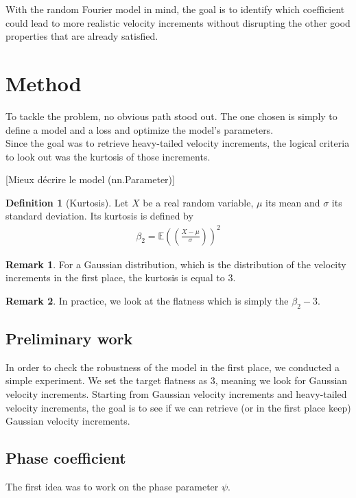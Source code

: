 \documentclass[a4paper,12pt]{article}
\theoremstyle{definition}
\newtheorem{definition}{Definition}
\newtheorem{remark}{Remark}
\begin{document}
\bigskip
With the random Fourier model in mind, the goal is to identify which coefficient could lead to more realistic velocity increments without disrupting the other good properties that are already satisfied. 


\section{Method}
To tackle the problem, no obvious path stood out. 
The one chosen is simply to define a model and a loss and optimize the model's parameters. \\
Since the goal was to retrieve heavy-tailed velocity increments, the logical criteria to look out was the kurtosis of those increments. 

[Mieux décrire le model (nn.Parameter)]

\begin{definition}[Kurtosis]
    Let $X$ be a real random variable, $\mu$ its mean and $\sigma$ its standard deviation. Its kurtosis is defined by 
    \begin{align}
    \beta_2=\mathbb{E}\left((\frac{X-\mu}{\sigma}) \right)^2    
    \end{align}
     
\end{definition}

\begin{remark}
    For a Gaussian distribution, which is the distribution of the velocity increments in the first place, the kurtosis is equal to 3.
\end{remark}

\begin{remark}
    In practice, we look at the flatness which is simply the $\beta_2-3$.
\end{remark}

\subsection{Preliminary work}
In order to check the robustness of the model in the first place, we conducted a simple experiment. We set the target flatness as 3, meaning we look for Gaussian velocity increments. Starting from Gaussian velocity increments and heavy-tailed velocity increments, the goal is to see if we can retrieve (or in the first place keep) Gaussian velocity increments.  


\subsection{Phase coefficient}
The first idea was to work on the phase parameter $\psi$. 
\end{document}
